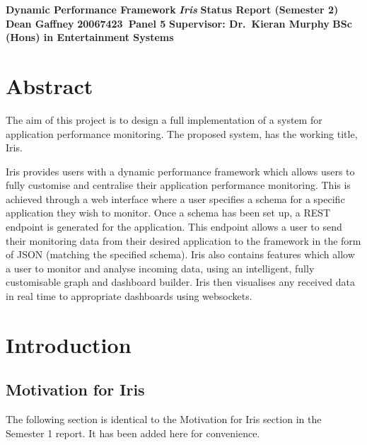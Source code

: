 \documentclass[12pt,a4paper,titlepage]{report}
\newcommand\AcademicTitle{Dynamic Performance Framework}
\newcommand\CommericalTitle{Iris}
\newcommand\Author{Dean Gaffney}
\newcommand\StudentID{20067423}
\newcommand\Report{Status Report (Semester 2)}
\newcommand\Reader{Supervisor: Dr.~Kieran Murphy}
\newcommand\SecondReader{Second Reader: David Drohan}
\begin{document}

\thispagestyle{empty}
\begin{center}
\mbox{}\vfill
{\fontsize{18pt}{20pt}\selectfont \bfseries \AcademicTitle}
\vfill
{\fontsize{14pt}{20pt}\selectfont \bfseries\itshape \CommericalTitle}
\vfill
{\fontsize{12pt}{20pt}\selectfont \bfseries \Report}
\vfill
{\fontsize{14pt}{20pt}\selectfont \bfseries \Author}
\vfill
{\fontsize{14pt}{20pt}\selectfont \bfseries \StudentID\ Panel 5}
\vfill
{\fontsize{14pt}{20pt}\selectfont \bfseries \Reader}
\vfill
\vfill
{\fontsize{14pt}{20pt}\selectfont \bfseries BSc (Hons) in Entertainment Systems}
\vfill
\end{center}
\clearpage

\tableofcontents
\listoftables
\listoffigures

\clearpage
{}
\setcounter{page}{1}

\chapter{Abstract}

The aim of this project is to design a full implementation of a system for application performance monitoring. The proposed system, has the working title,  Iris.

Iris provides users with a dynamic performance framework which allows users to fully customise and centralise their application performance monitoring. This is achieved through a web interface where a user specifies a schema for a specific application they wish to monitor. Once a schema has been set up, a REST endpoint is generated for the application. This endpoint allows a user to send their monitoring data from their desired application to the framework in the form of JSON (matching the specified schema). Iris also contains features which allow a user to monitor and analyse incoming data, using an intelligent, fully customisable graph and dashboard builder. Iris then visualises any received data in real time to appropriate dashboards using websockets.

\chapter{Introduction}

\section{Motivation for Iris}
The following section is identical to the Motivation for Iris section in the Semester 1 report. It has been added here for convenience.
\end{document}
